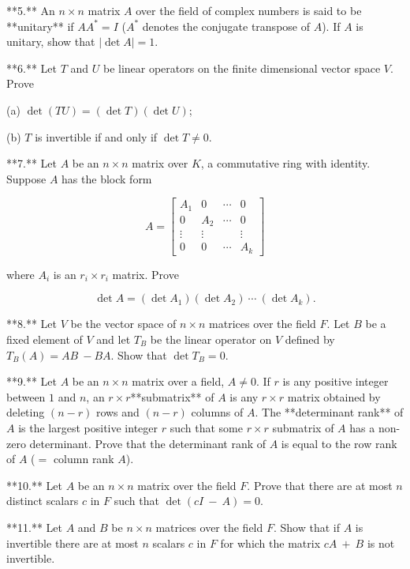 

**5.** An \(n\times n\) matrix \(A\) over the field of complex numbers is said to be **unitary** if \(AA^{*}=I\) (\(A^{*}\) denotes the conjugate transpose of \(A\)). If \(A\) is unitary, show that \(|\det A|=1\).

**6.** Let \(T\) and \(U\) be linear operators on the finite dimensional vector space \(V\). Prove

(a) \(\det(TU)=(\det T)(\det U)\);

(b) \(T\) is invertible if and only if \(\det T\neq 0\).

**7.** Let \(A\) be an \(n\times n\) matrix over \(K\), a commutative ring with identity. Suppose \(A\) has the block form

\[A=\begin{bmatrix}A_{1}&0&\cdots&0\\ 0&A_{2}&\cdots&0\\ \vdots&\vdots&&\vdots\\ 0&0&\cdots&A_{k}\end{bmatrix}\]

where \(A_{i}\) is an \(r_{i}\times r_{i}\) matrix. Prove

\[\det A=(\det A_{1})(\det A_{2})\ \cdots\ (\det A_{k}).\]

**8.** Let \(V\) be the vector space of \(n\times n\) matrices over the field \(F\). Let \(B\) be a fixed element of \(V\) and let \(T_{B}\) be the linear operator on \(V\) defined by \(T_{B}(A)=AB\ -BA\). Show that \(\det T_{B}=0\).

**9.** Let \(A\) be an \(n\times n\) matrix over a field, \(A\neq 0\). If \(r\) is any positive integer between \(1\) and \(n\), an \(r\times r\)**submatrix** of \(A\) is any \(r\times r\) matrix obtained by deleting \((n-r)\) rows and \((n-r)\) columns of \(A\). The **determinant rank** of \(A\) is the largest positive integer \(r\) such that some \(r\times r\) submatrix of \(A\) has a non-zero determinant. Prove that the determinant rank of \(A\) is equal to the row rank of \(A\) (\(=\) column rank \(A\)).

**10.** Let \(A\) be an \(n\times n\) matrix over the field \(F\). Prove that there are at most \(n\) distinct scalars \(c\) in \(F\) such that \(\det(cI\ -\ A)=0\).

**11.** Let \(A\) and \(B\) be \(n\times n\) matrices over the field \(F\). Show that if \(A\) is invertible there are at most \(n\) scalars \(c\) in \(F\) for which the matrix \(cA\ +\ B\) is not invertible.

